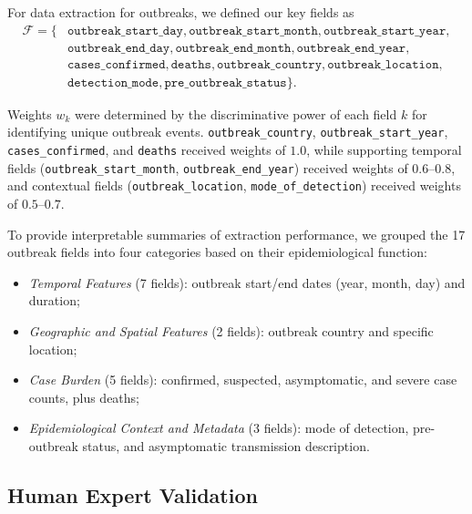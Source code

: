 For data extraction for outbreaks, we defined our key fields as
\begin{align*}
        \mathcal{F} = \{&\texttt{outbreak\_start\_day}, \texttt{outbreak\_start\_month}, \texttt{outbreak\_start\_year},\\&
        \texttt{outbreak\_end\_day}, \texttt{outbreak\_end\_month}, \texttt{outbreak\_end\_year},\\&
        \texttt{cases\_confirmed}, \texttt{deaths}, \texttt{outbreak\_country}, \texttt{outbreak\_location},\\& \texttt{detection\_mode}, \texttt{pre\_outbreak\_status}\}.
\end{align*}

Weights $w_k$ were determined by the discriminative power of each field $k$ for identifying unique outbreak events. \texttt{outbreak\_country}, \texttt{outbreak\_start\_year}, \texttt{cases\_confirmed}, and \texttt{deaths} received weights of $1.0$, while supporting temporal fields (\texttt{outbreak\_start\_month}, \texttt{outbreak\_end\_year}) received weights of $0.6$--$0.8$, and contextual fields (\texttt{outbreak\_location}, \texttt{mode\_of\_detection}) received weights of $0.5$--$0.7$.

To provide interpretable summaries of extraction performance, we grouped the 17 outbreak fields into four categories based on their epidemiological function:
\vspace{-8pt}
\begin{itemize}[leftmargin=*, itemsep=-3pt]
\item \textit{Temporal Features} (7 fields): outbreak start/end dates (year, month, day) and duration;
\item \textit{Geographic and Spatial Features} (2 fields): outbreak country and specific location;
\item \textit{Case Burden} (5 fields): confirmed, suspected, asymptomatic, and severe case counts, plus deaths;
\item \textit{Epidemiological Context and Metadata} (3 fields): mode of detection, pre-outbreak status, and asymptomatic transmission description.
\end{itemize}





\subsection{Human Expert Validation}\label{app:human_expert_validation}

